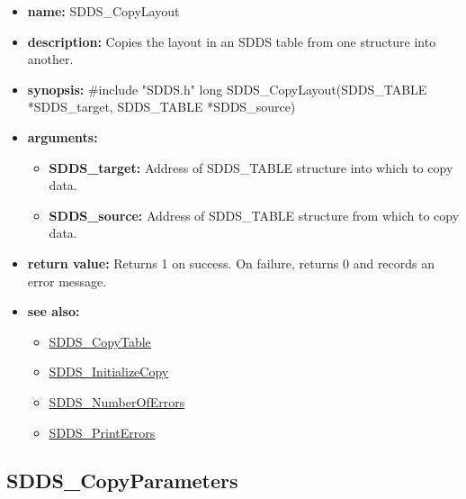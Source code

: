 \documentclass[11pt]{article}
\newcommand{\progref}[1]{\hyperref{SDDS_#1}{{\tt SDDS\_#1} (}{)}{SDDS_#1}}
\begin{document}
\begin{itemize}
\item {\bf name:}\newline
SDDS\_CopyLayout
\item {\bf description:}\newline
Copies the layout in an SDDS table from one structure into another.
\item {\bf synopsis:} \#include "SDDS.h"\newline
long SDDS\_CopyLayout(SDDS\_TABLE *SDDS\_target, SDDS\_TABLE *SDDS\_source)
\item {\bf arguments:}
\begin{itemize}
\item {\bf SDDS\_target:} Address of SDDS\_TABLE structure into which to copy data.
\item {\bf SDDS\_source:} Address of SDDS\_TABLE structure from which to copy data.
\end{itemize}
\item {\bf return value:}\newline
Returns 1 on success. On failure, returns 0 and records an error message.
\item {\bf see also:}
\begin{itemize}
\item \progref{CopyTable}
\item \progref{InitializeCopy}
\item \progref{NumberOfErrors}
\item \progref{PrintErrors}
\end{itemize}
\end{itemize}

\subsection{SDDS\_CopyParameters}
\label{SDDS_CopyParameters}
\end{document}
